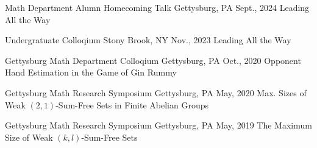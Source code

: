 


\begin{cventries}




\cventrylighttwo
  {Math Department Alumn Homecoming Talk} %
  {Gettysburg, PA} %
  {Sept., 2024} %
  {Leading All the Way}%





\cventrylighttwo
  {Undergratuate Colloqium} %
  {Stony Brook, NY} %
  {Nov., 2023} %
  {Leading All the Way}



  \cventrylighttwo
  {Gettysburg Math Department Colloqium} %
  {Gettysburg, PA} %
  {Oct., 2020} %
  {Opponent Hand Estimation in the Game of Gin Rummy}
 

\cventrylighttwo
  {Gettysburg Math Research Symposium} %
  {Gettysburg, PA} %
  {May, 2020} %
  {Max. Sizes of Weak $(2,1)$-Sum-Free Sets in Finite Abelian Groups}


\cventrylighttwo
  {Gettysburg Math Research Symposium} %
  {Gettysburg, PA} %
  {May, 2019} %
  {The Maximum Size of Weak $(k,l)$-Sum-Free Sets}





\end{cventries}